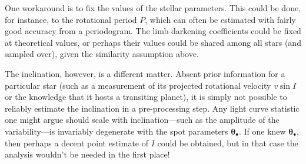 \documentclass[modern]{aastex62}
\begin{document}
One workaround is to fix the values of the stellar parameters. This could be done,
for instance, to the rotational period $P$, which can often be estimated with
fairly good accuracy from a periodogram. The limb darkening coefficients could
be fixed at theoretical values, or perhaps their values could be shared among
all stars (and sampled over), given the similarity assumption above.

The inclination, however, is a different matter. Absent prior information
for a particular star (such as a measurement of its projected rotational
velocity $v\sin I$ or the knowledge that it hosts a transiting planet), it
is simply not possible to reliably estimate the inclination in a
pre-processing step. Any light curve statistic one might argue should scale
with inclination---such as the amplitude of the variability---is invariably
degenerate with the spot parameters $\pmb{\theta}_\bullet$. If one knew
$\pmb{\theta}_\bullet$, then perhaps a decent point estimate of $I$ could
be obtained, but in that case the analysis wouldn't be needed in the first place!
%
\end{document}
